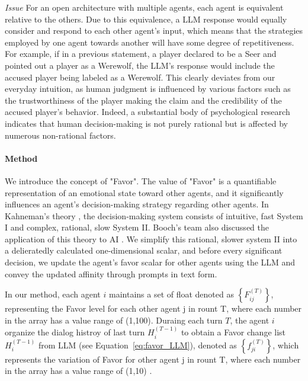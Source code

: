 \textit{Issue} For an open architecture with multiple agents, each agent is equivalent relative to the others. Due to this equivalence, a LLM response would equally consider and respond to each other agent's input, which means that the strategies employed by one agent towards another will have some degree of repetitiveness.  For example, if in a previous statement, a player declared to be a Seer and pointed out a player as a Werewolf, the LLM's response would include the accused player being labeled as a Werewolf. This clearly deviates from our everyday intuition, as human judgment is influenced by various factors such as the trustworthiness of the player making the claim and the credibility of the accused player's behavior. Indeed, a substantial body of psychological research \citep{kahneman2013prospect,kahneman1982psychology,simon1991bounded,luhmann2018trust,cho2015survey} indicates that human decision-making is not purely rational but is affected by numerous non-rational factors.

\paragraph{Method} We introduce the concept of "Favor". The value of "Favor" is a quantifiable representation of an emotional state toward other agents, and it significantly influences an agent's decision-making strategy regarding other agents. In Kahneman's theory \citep{daniel2017thinking}, the decision-making system consists of intuitive, fast System I and complex, rational, slow System II. Booch's team also discussed the application of this theory to AI \citep{booch2021thinking}. We simplify this rational, slower system II into a delieratedly calculated one-dimensional scalar, and before every significant decision, we update the agent's favor scalar for other agents using the LLM and convey the updated affinity through prompts in text form.

In our method, each agent $ i $  maintains a set of float denoted as $ \left\{ F_{ij}^{(T)} \right\} $, representing the Favor level for each other agent j in rount T, where each number in the array has a value range of (1,100). Duraing each turn $ T $, the agent $ i $ organize the dialog histroy of last turn $ H_i^{(T-1)} $ to obtain a Favor change list $ H_i^{(T-1)} $ from LLM (see Equation~\ref{eq:favor_LLM}), denoted as $ \left\{ f_{ji}^{(T)} \right\} $, which represents the variation of Favor for other agent j in rount T, where each number in the array has a value range of (1,10) .

